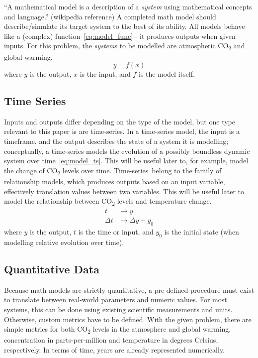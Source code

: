 \documentclass{mcmthesis}
\begin{document}
    ``A mathematical model is a description of a \textit{system} using mathematical concepts and language.'' (wikipedia reference) A completed math model should describe/simulate it\textquotesingle s target system to the best of its ability. All models behave like a (complex) function~\eqref{eq:model_func} - it produces outputs when given inputs. For this problem, the \textit{system}s to be modelled are atmospheric CO\textsubscript{2} and global warming.
%
    \begin{equation}
        y = f(x)
        \label{eq:model_func}
    \end{equation}
%
    \noindent where $y$ is the output, $x$ is the input, and $f$ is the model itself.

    \subsection{Time Series}

    Inputs and outputs differ depending on the type of the model, but one type relevant to this paper is are time-series\textquotesingle . In a time-series model, the input is a timeframe, and the output describes the state of a system it is modelling; conceptually, a time-series models the evolution of a possibly boundless dynamic system over time~\eqref{eq:model_ts}. This will be useful later to, for example, model the change of CO\textsubscript{2} levels over time. Time-series\textquotesingle~belong to the family of relationship models, which produces outputs based on an input variable, effectively translation values between two variables. This will be useful later to model the relationship between CO\textsubscript{2} levels and temperature change.
%
    \begin{equation}
        \begin{aligned}
            t & \rightarrow y \\
            \Delta t & \rightarrow \Delta y + y_0
        \end{aligned}
        \label{eq:model_ts}
    \end{equation}
%
    \noindent where $y$ is the output, $t$ is the time or input, and $y_0$ is the initial state (when modelling relative evolution over time).

    \subsection{Quantitative Data}

    Because math models are strictly quantitative, a pre-defined procedure must exist to translate between real-world parameters and numeric values. For most systems, this can be done using existing scientific measurements and units. Otherwise, custom metrics have to be defined. With the given problem, there are simple metrics for both CO\textsubscript{2} levels in the atmosphere and global warming, concentration in parts-per-million and temperature in degrees Celsius, respectively. In terms of time, years are already represented numerically.
\end{document}
